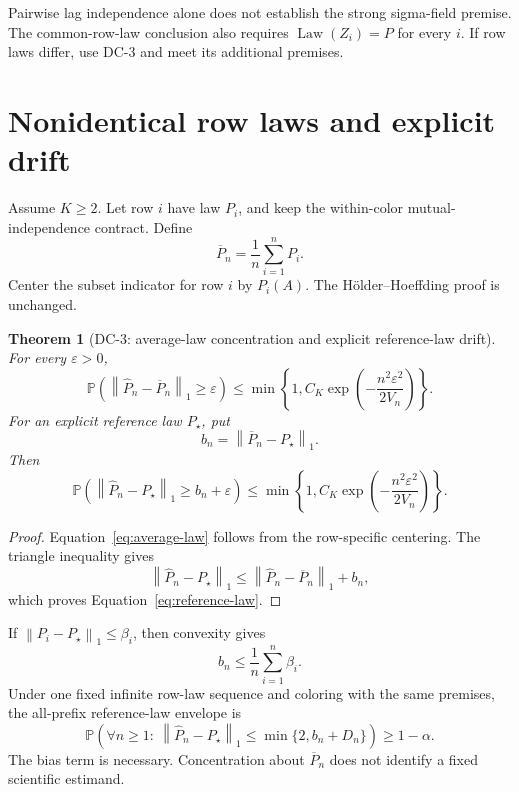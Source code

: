 \documentclass[11pt]{article}
\newtheorem{theorem}{Theorem}[section]
\theoremstyle{definition}
\newcommand{\Phat}{\widehat{P}}
\newcommand{\Pbar}{\overline{P}}
\newcommand{\Prb}{\mathbb{P}}
\newcommand{\normone}[1]{\left\lVert #1\right\rVert_1}
\begin{document}
Pairwise lag independence alone does not establish the strong sigma-field premise.  The
common-row-law conclusion also requires $\operatorname{Law}(Z_i)=P$ for every $i$.  If row laws
differ, use DC-3 and meet its additional premises.

\section{Nonidentical row laws and explicit drift}

Assume $K\ge2$.  Let row $i$ have law $P_i$, and keep the within-color
mutual-independence contract.  Define
\begin{equation}
  \Pbar_n=\frac1n\sum_{i=1}^{n}P_i.
\end{equation}
Center the subset indicator for row $i$ by $P_i(A)$.  The H{\"o}lder--Hoeffding proof is unchanged.

\begin{theorem}[DC-3: average-law concentration and explicit reference-law drift]\label{thm:drift}
For every $\varepsilon>0$,
\begin{equation}\label{eq:average-law}
  \Prb\!\left(\normone{\Phat_n-\Pbar_n}\ge\varepsilon\right)
  \le
  \min\!\left\{
    1,
    C_K\exp\!\left(-\frac{n^2\varepsilon^2}{2V_n}\right)
  \right\}.
\end{equation}
For an explicit reference law $P_\star$, put
\begin{equation}
  b_n=\normone{\Pbar_n-P_\star}.
\end{equation}
Then
\begin{equation}\label{eq:reference-law}
  \Prb\!\left(
    \normone{\Phat_n-P_\star}\ge b_n+\varepsilon
  \right)
  \le
  \min\!\left\{
    1,
    C_K\exp\!\left(-\frac{n^2\varepsilon^2}{2V_n}\right)
  \right\}.
\end{equation}
\end{theorem}

\begin{proof}
Equation~\eqref{eq:average-law} follows from the row-specific centering.  The triangle inequality
gives
\begin{equation}
  \normone{\Phat_n-P_\star}
  \le\normone{\Phat_n-\Pbar_n}+b_n,
\end{equation}
which proves Equation~\eqref{eq:reference-law}.
\end{proof}

If $\normone{P_i-P_\star}\le\beta_i$, then convexity gives
\begin{equation}
  b_n\le\frac1n\sum_{i=1}^{n}\beta_i.
\end{equation}
Under one fixed infinite row-law sequence and coloring with the same premises, the all-prefix
reference-law envelope is
\begin{equation}
  \Prb\!\left(
    \forall n\ge1:\
    \normone{\Phat_n-P_\star}\le\min\{2,b_n+D_n\}
  \right)\ge1-\alpha.
\end{equation}
The bias term is necessary.  Concentration about $\Pbar_n$ does not identify a fixed scientific
estimand.
\end{document}
